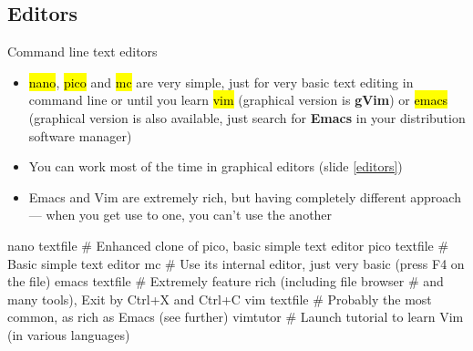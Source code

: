 \documentclass[compress, ucs, xelatex, 11pt, xcolor=svgnames,
  hyperref={
    bookmarks=true,
    unicode=true,
    colorlinks=true,
    pdftitle={Linux, command line and MetaCentrum},
    plainpages=false,
    pdfauthor={Vojtech Zeisek},
    pdfsubject={Course about use of Linux command line, writing shell scripts and using MetaCentrum of CESNET},
    pdfcreator={XeLaTeX},
    pdfkeywords={Linux, GNU, BASH, shell, command line, MetaCentrum},
    linkcolor=DarkRed,
    anchorcolor=DarkBlue,
    citecolor=Indigo,
    filecolor=NavyBlue,
    menucolor=DarkMagenta,
    urlcolor=DarkBlue,
    pdftex},
  url={hyphens, lowtilde} %
  ]{beamer}
\renewcommand{\texttt}[1]{\hl{\ttfamily #1}}
\begin{document}

\subsection{Editors} 

\begin{frame}[fragile]{Command line text editors}
  \begin{itemize}
    \item \texttt{nano}, \texttt{pico} and \texttt{mc} are very simple, just for very basic text editing in command line or until you learn \texttt{vim} (graphical version is \textbf{gVim}) or \texttt{emacs} (graphical version is also available, just search for \textbf{Emacs} in your distribution software manager)
    \item You can work most of the time in graphical editors (slide \ref{editors})
    \item Emacs and Vim are extremely rich, but having completely different approach --- when you get use to one, you can't use the another
  \end{itemize}
  \begin{bashcode}
    nano textfile # Enhanced clone of pico, basic simple text editor
    pico textfile # Basic simple text editor
    mc # Use its internal editor, just very basic (press F4 on the file)
    emacs textfile # Extremely feature rich (including file browser
                   # and many tools), Exit by Ctrl+X and Ctrl+C
    vim textfile # Probably the most common, as rich as Emacs (see further)
    vimtutor # Launch tutorial to learn Vim (in various languages)
   \end{bashcode}
\end{frame}
\end{document}
